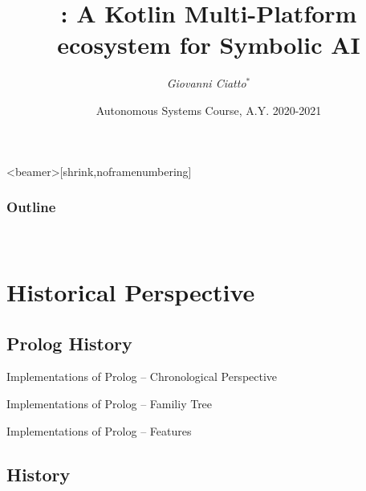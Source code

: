 \documentclass[presentation]{beamer}
\title[\twopkt]{
    \twopkt{}: A Kotlin Multi-Platform ecosystem for Symbolic AI 
}
\author[Ciatto G.]{
	\emph{Giovanni Ciatto}$^{*}$ %
}
\institute[UniBo]{
    $^{*}$Dipartimento di Informatica -- Scienza e Ingegneria (DISI)
    \\
    \textsc{Alma Mater Studiorum} -- Università di Bologna
    \\
    \texttt{
        giovanni.ciatto@unibo.it %
    }
}
\date[A.Y. 20-21]{
	Autonomous Systems Course, A.Y. 2020-2021
}
\begin{document}

\frame{\titlepage}

\begin{frame}<beamer>[shrink,noframenumbering]\frametitle{Outline}
    \mbox{~}
    \tableofcontents
    \mbox{~}
\end{frame}

\section{Historical Perspective}

\subsection{Prolog History}

\begin{frame}{Implementations of Prolog -- Chronological Perspective}
    
\end{frame}

\begin{frame}{Implementations of Prolog -- Familiy Tree}
    
\end{frame}

\begin{frame}[allowframebreaks]{Implementations of Prolog -- Features}
    
\end{frame}

\subsection{\tuprolog{} History}
\end{document}
